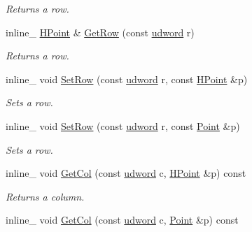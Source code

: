 \begin{DoxyCompactItemize}
\begin{DoxyCompactList}\small\item\em Returns a row. \end{DoxyCompactList}\item 
\hypertarget{class_matrix4x4_a676a90f9991ea0b7ec6b544ba80af164}{inline\+\_\+ \hyperlink{class_h_point}{H\+Point} \& \hyperlink{class_matrix4x4_a676a90f9991ea0b7ec6b544ba80af164}{Get\+Row} (const \hyperlink{_ice_types_8h_a44c6f1920ba5551225fb534f9d1a1733}{udword} r)}\label{class_matrix4x4_a676a90f9991ea0b7ec6b544ba80af164}

\begin{DoxyCompactList}\small\item\em Returns a row. \end{DoxyCompactList}\item 
\hypertarget{class_matrix4x4_a5e6eb34412992ba88352195ac93732df}{inline\+\_\+ void \hyperlink{class_matrix4x4_a5e6eb34412992ba88352195ac93732df}{Set\+Row} (const \hyperlink{_ice_types_8h_a44c6f1920ba5551225fb534f9d1a1733}{udword} r, const \hyperlink{class_h_point}{H\+Point} \&p)}\label{class_matrix4x4_a5e6eb34412992ba88352195ac93732df}

\begin{DoxyCompactList}\small\item\em Sets a row. \end{DoxyCompactList}\item 
\hypertarget{class_matrix4x4_a6182d58b4005e94820da408be3be75b3}{inline\+\_\+ void \hyperlink{class_matrix4x4_a6182d58b4005e94820da408be3be75b3}{Set\+Row} (const \hyperlink{_ice_types_8h_a44c6f1920ba5551225fb534f9d1a1733}{udword} r, const \hyperlink{class_point}{Point} \&p)}\label{class_matrix4x4_a6182d58b4005e94820da408be3be75b3}

\begin{DoxyCompactList}\small\item\em Sets a row. \end{DoxyCompactList}\item 
\hypertarget{class_matrix4x4_a98031f98b3ceabda8bb299df1963db72}{inline\+\_\+ void \hyperlink{class_matrix4x4_a98031f98b3ceabda8bb299df1963db72}{Get\+Col} (const \hyperlink{_ice_types_8h_a44c6f1920ba5551225fb534f9d1a1733}{udword} c, \hyperlink{class_h_point}{H\+Point} \&p) const }\label{class_matrix4x4_a98031f98b3ceabda8bb299df1963db72}

\begin{DoxyCompactList}\small\item\em Returns a column. \end{DoxyCompactList}\item 
\hypertarget{class_matrix4x4_ae97452b5679c1efaa91aaf55e9d241a6}{inline\+\_\+ void \hyperlink{class_matrix4x4_ae97452b5679c1efaa91aaf55e9d241a6}{Get\+Col} (const \hyperlink{_ice_types_8h_a44c6f1920ba5551225fb534f9d1a1733}{udword} c, \hyperlink{class_point}{Point} \&p) const }\label{class_matrix4x4_ae97452b5679c1efaa91aaf55e9d241a6}


\end{DoxyCompactItemize}
